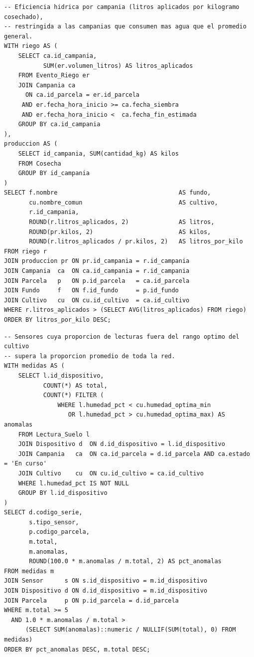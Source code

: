 \documentclass[11pt,letterpaper]{article}
\begin{document}
\begin{lstlisting}[style=sql, title={Consulta 2}]
-- Eficiencia hidrica por campania (litros aplicados por kilogramo cosechado),
-- restringida a las campanias que consumen mas agua que el promedio general.
WITH riego AS (
    SELECT ca.id_campania,
           SUM(er.volumen_litros) AS litros_aplicados
    FROM Evento_Riego er
    JOIN Campania ca
      ON ca.id_parcela = er.id_parcela
     AND er.fecha_hora_inicio >= ca.fecha_siembra
     AND er.fecha_hora_inicio <  ca.fecha_fin_estimada
    GROUP BY ca.id_campania
),
produccion AS (
    SELECT id_campania, SUM(cantidad_kg) AS kilos
    FROM Cosecha
    GROUP BY id_campania
)
SELECT f.nombre                                  AS fundo,
       cu.nombre_comun                           AS cultivo,
       r.id_campania,
       ROUND(r.litros_aplicados, 2)              AS litros,
       ROUND(pr.kilos, 2)                        AS kilos,
       ROUND(r.litros_aplicados / pr.kilos, 2)   AS litros_por_kilo
FROM riego r
JOIN produccion pr ON pr.id_campania = r.id_campania
JOIN Campania  ca  ON ca.id_campania = r.id_campania
JOIN Parcela   p   ON p.id_parcela   = ca.id_parcela
JOIN Fundo     f   ON f.id_fundo     = p.id_fundo
JOIN Cultivo   cu  ON cu.id_cultivo  = ca.id_cultivo
WHERE r.litros_aplicados > (SELECT AVG(litros_aplicados) FROM riego)
ORDER BY litros_por_kilo DESC;
\end{lstlisting}

\begin{lstlisting}[style=sql, title={Consulta 3}]
-- Sensores cuya proporcion de lecturas fuera del rango optimo del cultivo
-- supera la proporcion promedio de toda la red.
WITH medidas AS (
    SELECT l.id_dispositivo,
           COUNT(*) AS total,
           COUNT(*) FILTER (
               WHERE l.humedad_pct < cu.humedad_optima_min
                  OR l.humedad_pct > cu.humedad_optima_max) AS anomalas
    FROM Lectura_Suelo l
    JOIN Dispositivo d  ON d.id_dispositivo = l.id_dispositivo
    JOIN Campania   ca  ON ca.id_parcela = d.id_parcela AND ca.estado = 'En curso'
    JOIN Cultivo    cu  ON cu.id_cultivo = ca.id_cultivo
    WHERE l.humedad_pct IS NOT NULL
    GROUP BY l.id_dispositivo
)
SELECT d.codigo_serie,
       s.tipo_sensor,
       p.codigo_parcela,
       m.total,
       m.anomalas,
       ROUND(100.0 * m.anomalas / m.total, 2) AS pct_anomalas
FROM medidas m
JOIN Sensor      s ON s.id_dispositivo = m.id_dispositivo
JOIN Dispositivo d ON d.id_dispositivo = m.id_dispositivo
JOIN Parcela     p ON p.id_parcela = d.id_parcela
WHERE m.total >= 5
  AND 1.0 * m.anomalas / m.total >
      (SELECT SUM(anomalas)::numeric / NULLIF(SUM(total), 0) FROM medidas)
ORDER BY pct_anomalas DESC, m.total DESC;
\end{lstlisting}
\end{document}
